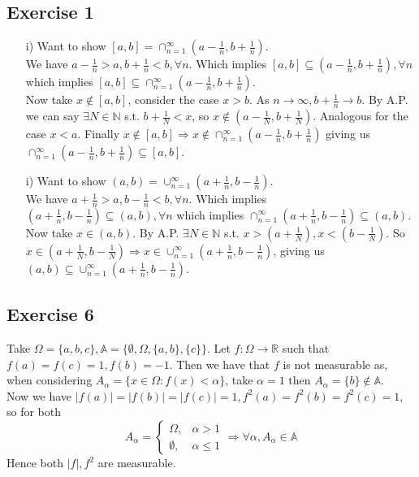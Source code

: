 \documentclass[a4paper, 12pt, twoside]{article}
\author{Joseph}
\begin{document}
\subsection*{Exercise 1}
\begin{itemize}
    \item[i)] Want to show $[a,b]=\cap_{n=1}^{\infty}(a- \frac{1}{n},b+ \frac{1}{n}) $.\\
    We have $a- \frac{1}{n}> a,b+ \frac{1}{n}< b, \forall n$. Which implies $[a,b]\subseteq(a- \frac{1}{n},b+ \frac{1}{n}), \forall n$ which implies $[a,b]\subseteq\cap_{n=1}^{\infty}(a- \frac{1}{n},b+ \frac{1}{n})$.\\
    Now take $x\not\in[a,b]$, consider the case $x>b$. As $n\to\infty, b+\frac{1}{n}\to b$. By A.P. we can say $\exists N\in \mathbb{N}$ s.t. $b+\frac{1}{N}<x$, so $x\not\in (a- \frac{1}{N},b+ \frac{1}{N})$.
    Analogous for the case $x<a$. Finally $x\not\in[a,b]\Rightarrow x\not\in\cap_{n=1}^{\infty}(a- \frac{1}{n},b+ \frac{1}{n}) $ giving us $\cap_{n=1}^{\infty}(a- \frac{1}{n},b+ \frac{1}{n}) \subseteq [a,b]$.
    \item[i)]Want to show $(a,b)=\cup_{n=1}^{\infty}(a+ \frac{1}{n},b- \frac{1}{n}) $.\\
    We have $a+ \frac{1}{n}> a,b- \frac{1}{n}< b, \forall n$. Which implies $(a+ \frac{1}{n},b- \frac{1}{n})\subseteq(a,b), \forall n$ which implies $\cap_{n=1}^{\infty}(a+ \frac{1}{n},b- \frac{1}{n})\subseteq(a,b)$.\\
    Now take $x\in(a,b)$. By A.P. $\exists N\in \mathbb{N} $ s.t. $x>(a+\frac{1}{N}),x<(b- \frac{1}{N})$. So $x\in(a+\frac{1}{N},b- \frac{1}{N}) \Rightarrow x\in \cup_{n=1}^{\infty}(a+ \frac{1}{n},b- \frac{1}{n}) $, giving us $(a,b)\subseteq\cup_{n=1}^{\infty}(a+ \frac{1}{n},b- \frac{1}{n})$.

\end{itemize}
\subsection*{Exercise 6}
Take $\Omega=\{a,b,c\},\mathbb{A}=\{\emptyset,\Omega,\{a,b\},\{c\}\}$. Let $f:\Omega\to \mathbb{R}$ such that $f(a)=f(c)=1,f(b)=-1$. Then we have that $f$ is not measurable as, when considering $A_{\alpha}=\{x\in\Omega: f(x)<\alpha\}$, take $\alpha = 1$ then $A_{\alpha}=\{b\}\not\in \mathbb{A}$.\\
Now we have $|f(a)|=|f(b)|=|f(c)|=1,f^{2}(a)=f^{2}(b)=f^{2}(c)=1$, so for both
$$A_{\alpha}=
\begin{cases}
  \Omega, & \alpha > 1 \\
  \emptyset, & \alpha \leq 1
\end{cases} \Rightarrow \forall\alpha, A_{\alpha}\in \mathbb{A}
$$
Hence both $|f|,f^{2}$ are measurable.
\end{document}
